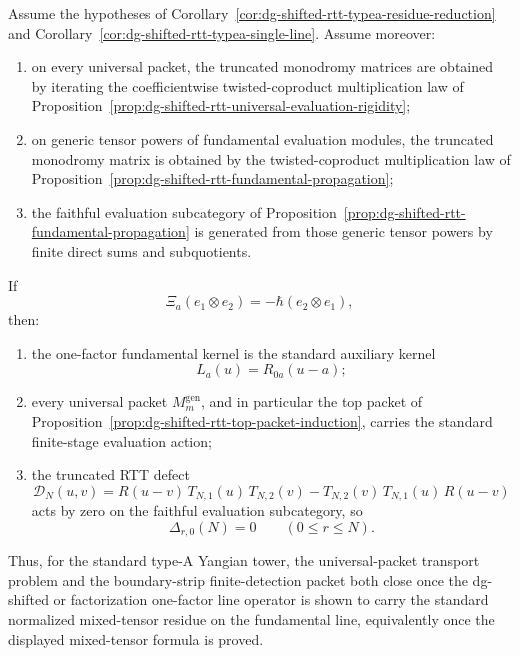 \begin{corollary}
\label{cor:dg-shifted-rtt-typea-single-line-bootstrap}
Assume the hypotheses of
Corollary~\ref{cor:dg-shifted-rtt-typea-residue-reduction}
and
Corollary~\ref{cor:dg-shifted-rtt-typea-single-line}.  Assume
moreover:
\begin{enumerate}[label=\textup{(\roman*)}]
\item on every universal packet, the truncated monodromy matrices are
  obtained by iterating the coefficientwise twisted-coproduct
  multiplication law of
  Proposition~\ref{prop:dg-shifted-rtt-universal-evaluation-rigidity};
\item on generic tensor powers of fundamental evaluation modules, the
  truncated monodromy matrix is obtained by the twisted-coproduct
  multiplication law of
  Proposition~\ref{prop:dg-shifted-rtt-fundamental-propagation};
\item the faithful evaluation subcategory of
  Proposition~\ref{prop:dg-shifted-rtt-fundamental-propagation} is
  generated from those generic tensor powers by finite direct sums and
  subquotients.
\end{enumerate}
If
\[
\Xi_a(e_1\otimes e_2)=-\hbar(e_2\otimes e_1),
\]
then:
\begin{enumerate}[label=\textup{(\alph*)}]
\item the one-factor fundamental kernel is the standard auxiliary
  kernel
  \[
  L_a(u)=R_{0a}(u-a);
  \]
\item every universal packet $M_m^{\mathrm{gen}}$, and in particular
  the top packet of
  Proposition~\ref{prop:dg-shifted-rtt-top-packet-induction}, carries
  the standard finite-stage evaluation action;
\item the truncated RTT defect
  \[
  \mathcal{D}_N(u,v)
  =
  R(u-v)\,T_{N,1}(u)\,T_{N,2}(v)
  -
  T_{N,2}(v)\,T_{N,1}(u)\,R(u-v)
  \]
  acts by zero on the faithful evaluation subcategory, so
  \[
  \Delta_{r,0}(N)=0
  \qquad (0\le r\le N).
  \]
\end{enumerate}
Thus, for the standard type-A Yangian tower, the universal-packet
transport problem and the boundary-strip finite-detection packet both
close once the dg-shifted or factorization one-factor line operator is
shown to carry the standard normalized mixed-tensor residue on the
fundamental line, equivalently once the displayed mixed-tensor formula
is proved.
\end{corollary}

